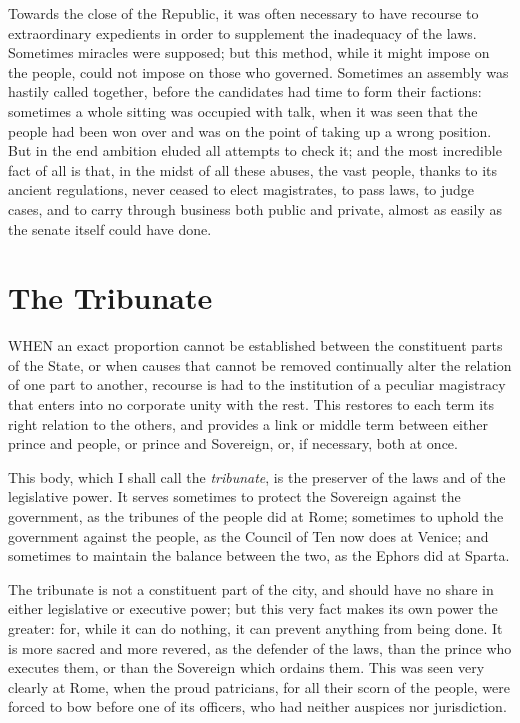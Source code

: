 \documentclass[12pt]{book}
\begin{document}
Towards the close of the Republic, it was often necessary to have recourse to extraordinary expedients in order to supplement the inadequacy of the laws. Sometimes miracles were supposed; but this method, while it might impose on the people, could not impose on those who governed. Sometimes an assembly was hastily called together, before the candidates had time to form their factions: sometimes a whole sitting was occupied with talk, when it was seen that the people had been won over and was on the point of taking up a wrong position. But in the end ambition eluded all attempts to check it; and the most incredible fact of all is that, in the midst of all these abuses, the vast people, thanks to its ancient regulations, never ceased to elect magistrates, to pass laws, to judge cases, and to carry through business both public and private, almost as easily as the senate itself could have done.

\section{The Tribunate}
WHEN an exact proportion cannot be established between the constituent parts of the State, or when causes that cannot be removed continually alter the relation of one part to another, recourse is had to the institution of a peculiar magistracy that enters into no corporate unity with the rest. This restores to each term its right relation to the others, and provides a link or middle term between either prince and people, or prince and Sovereign, or, if necessary, both at once.

This body, which I shall call the \textit{tribunate}, is the preserver of the laws and of the legislative power. It serves sometimes to protect the Sovereign against the government, as the tribunes of the people did at Rome; sometimes to uphold the government against the people, as the Council of Ten now does at Venice; and sometimes to maintain the balance between the two, as the Ephors did at Sparta.

The tribunate is not a constituent part of the city, and should have no share in either legislative or executive power; but this very fact makes its own power the greater: for, while it can do nothing, it can prevent anything from being done. It is more sacred and more revered, as the defender of the laws, than the prince who executes them, or than the Sovereign which ordains them. This was seen very clearly at Rome, when the proud patricians, for all their scorn of the people, were forced to bow before one of its officers, who had neither auspices nor jurisdiction.
\end{document}

